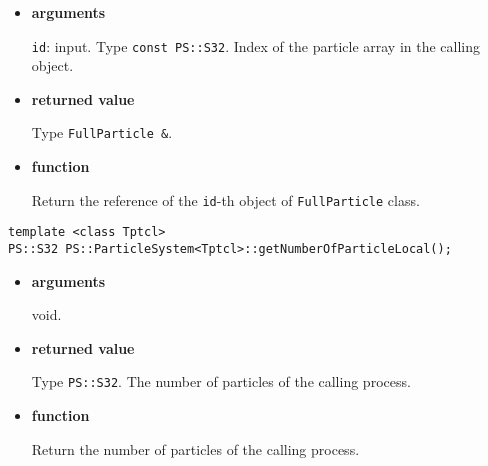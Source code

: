 \begin{itemize}

\item {\bf arguments}

{\tt id}: input. Type {\tt const PS::S32}. Index of the particle array in the calling object.

\item {\bf returned value}

Type {\tt FullParticle \&}.


\item {\bf function}

Return the reference of the {\tt id}-th object of {\tt FullParticle} class.


\end{itemize}




\begin{screen}
\begin{verbatim}
template <class Tptcl>
PS::S32 PS::ParticleSystem<Tptcl>::getNumberOfParticleLocal();
\end{verbatim}
\end{screen}

\begin{itemize}

\item {\bf arguments}

void.

\item {\bf returned value}

Type {\tt PS::S32}. The number of particles of the calling process.


\item {\bf function}

Return the number of particles of the calling process.


\end{itemize}


